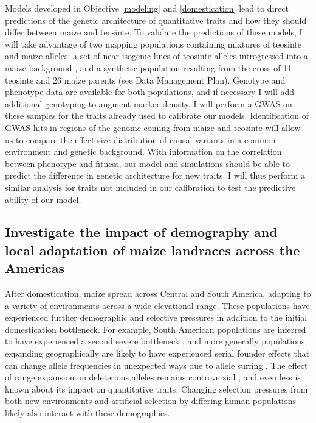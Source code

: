 Models developed in Objective \ref{modeling} and \ref{domestication} lead to direct predictions of the genetic architecture of quantitative traits and how they should differ between maize and teosinte. To validate the predictions of these models, I will take advantage of two mapping populations containing mixtures of teosinte and maize alleles: a set of near isogenic lines of teosinte alleles introgressed into a maize background \citep{Liu:InPress}, and a synthetic population resulting from the cross of 11 teosinte and 26 maize parents (see Data Management Plan). Genotype and phenotype data are available for both populations, and if necessary I will add additional genotyping to augment marker density.
I will perform a GWAS on these samples for the traits already used to calibrate our models. Identification of GWAS hits in regions of the genome coming from maize and teosinte will allow us to compare the effect size distribution of causal variants in a common environment and genetic background. With information on the correlation between phenotype and fitness, our model and simulations should be able to predict the difference in genetic architecture for new traits. I will thus perform a similar analysis for traits not included in our calibration to test the predictive ability of our model. 

\subsection{Investigate the impact of demography and local adaptation of maize landraces across the Americas} \vspace{-1ex}
\label{surfing}

After domestication, maize spread across Central and South America, adapting to a variety of environments across a wide elevational range. These populations have experienced further demographic and selective pressures in addition to the initial domestication bottleneck. For example, South American populations are inferred to have experienced a second severe bottleneck \citep{Takuno:2015eu}, and more generally populations expanding geographically are likely to have experienced serial founder effects that can change allele frequencies in unexpected ways due to allele surfing \citep{Klopfstein:2005bl}. The effect of range expansion on deleterious alleles remains controversial \citep{Henn:2015ce, Henn:2015dp, Simons:2014fj, Sudmant:2015}, and even less is known about its impact on quantitative traits. Changing selection pressures from both new environments and artificial selection by differing human populations likely also interact with these demographies. 

